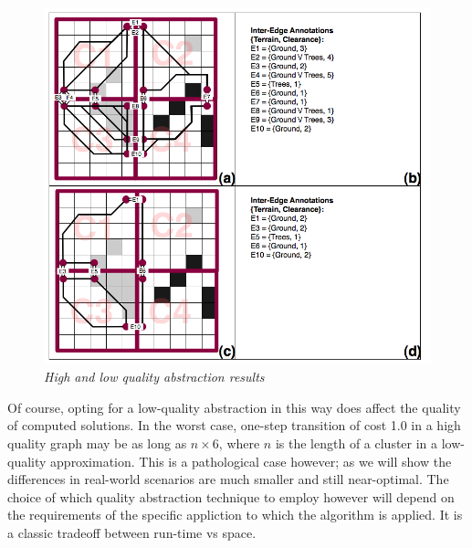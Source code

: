 \begin{figure}[htbp]
        \caption{\emph{High and low quality abstraction results} }
        \begin{center}
                        \includegraphics[scale=0.25]{diagrams/abstraction_result.png}
        \end{center}
        \label{aha-fig:abstractgraph}
\end{figure}
\par \indent
Of course, opting for a low-quality abstraction in this way does affect the quality of computed solutions. 
In the worst case, one-step transition of cost 1.0 in a high quality graph may be as long as $n \times 6$, where $n$ is the length of a cluster in a low-quality approximation.
This is a pathological case however; as we will show the differences in real-world scenarios are much smaller and still near-optimal. 
The choice of which quality abstraction technique to employ however will depend on the requirements of the specific appliction to which the algorithm is applied.
It is a classic tradeoff between run-time vs space.
